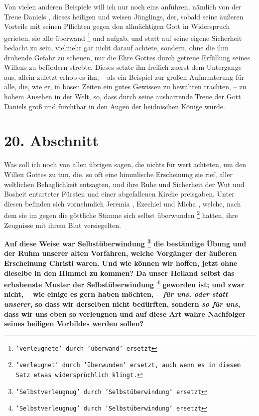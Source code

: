 Von vielen anderen Beispiele will ich nur noch eins anführen, nämlich von der
Treue Daniels , dieses heiligen  und
weisen Jünglings, der, sobald seine äußeren
Vorteile mit seinen Pflichten gegen den allmächtigen Gott in Widerspruch
gerieten, sie alle überwand \footnote{\texttt{'verleugnete' durch 'überwand'
ersetzt}} und aufgab, und statt auf seine eigene
Sicherheit bedacht zu sein, vielmehr gar nicht darauf achtete, sondern, ohne die
ihm drohende Gefahr zu scheuen, nur die Ehre Gottes durch getreue Erfüllung
seines Willens zu befördern strebte. Dieses setzte ihn freilich zuerst dem
Untergange aus, allein zuletzt erhob es ihn, -- als ein Beispiel zur großen
Aufmunterung für alle, die, wie er, in bösen Zeiten ein gutes Gewissen zu
bewahren trachten, -- zu hohem Ansehen in der Welt, so, dass durch seine
ausharrende Treue der Gott Daniels groß und furchtbar in den Augen der
heidnischen Könige wurde.

\section{20. Abschnitt} \label{kap4_ab20}

Was soll ich noch von allen übrigen sagen, die nichts für wert achteten, um den
Willen Gottes zu tun, die, so oft eine himmlische Erscheinung sie rief, aller
weltlichen Behaglichkeit entsagten, und ihre Ruhe und Sicherheit der Wut und
Bosheit entarteter Fürsten und einer abgefallenen Kirche  preisgaben. Unter
diesen befinden sich vornehmlich Jeremia , Ezechiel
 und Micha , welche, nach dem
sie im gegen die göttliche Stimme sich selbst überwunden
\footnote{\texttt{'verleugnet' durch 'überwunden' ersetzt, auch wenn es in diesem Satz
etwas widersprüchlich klingt.}} hatten, ihre Zeugnisse
mit ihrem Blut versiegelten.

\medskip

  \textbf{Auf diese Weise war Selbstüberwindung
\footnote{\texttt{'Selbstverleugnug' durch 'Selbstüberwindung' ersetzt}}
die beständige Übung und der Ruhm
unserer alten Vorfahren, welche Vorgänger der äußeren Erscheinung Christi waren.
Und wie können wir hoffen, jetzt ohne dieselbe in den Himmel  zu kommen? Da
unser Heiland selbst das erhabenste Muster der Selbstüberwindung \footnote{\texttt{'Selbstverleugnug'
durch 'Selbstüberwindung' ersetzt}} geworden ist;
und zwar nicht, -- wie einige es gern haben möchten, -- \textit{für uns, oder
statt
unserer}, so dass wir derselben nicht bedürften, sondern \textit{so für uns}, dass
wir uns eben so verleugnen und auf diese Art wahre Nachfolger seines heiligen
Vorbildes werden sollen?}

